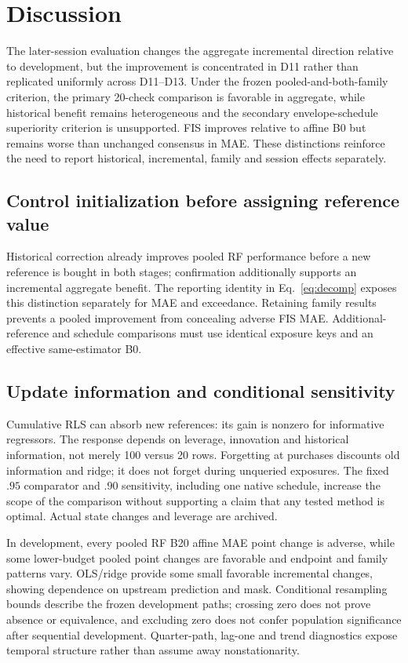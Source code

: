 \section{Discussion}\label{sec:discussion}
The later-session evaluation changes the aggregate incremental direction relative to development, but the improvement is concentrated in D11 rather than replicated uniformly across D11--D13. Under the frozen pooled-and-both-family criterion, the primary 20-check comparison is favorable in aggregate, while historical benefit remains heterogeneous and the secondary envelope-schedule superiority criterion is unsupported. FIS improves relative to affine B0 but remains worse than unchanged consensus in MAE. These distinctions reinforce the need to report historical, incremental, family and session effects separately.

\subsection{Control initialization before assigning reference value}
Historical correction already improves pooled RF performance before a new reference is bought in both stages; confirmation additionally supports an incremental aggregate benefit. The reporting identity in Eq.~\eqref{eq:decomp} exposes this distinction separately for MAE and exceedance. Retaining family results prevents a pooled improvement from concealing adverse FIS MAE. Additional-reference and schedule comparisons must use identical exposure keys and an effective same-estimator B0.

\subsection{Update information and conditional sensitivity}
Cumulative RLS can absorb new references: its gain is nonzero for informative regressors. The response depends on leverage, innovation and historical information, not merely 100 versus 20 rows. Forgetting at purchases discounts old information and ridge; it does not forget during unqueried exposures. The fixed $.95$ comparator and $.90$ sensitivity, including one native schedule, increase the scope of the comparison without supporting a claim that any tested method is optimal. Actual state changes and leverage are archived.

In development, every pooled RF B20 affine MAE point change is adverse, while some lower-budget pooled point changes are favorable and endpoint and family patterns vary. OLS/ridge provide some small favorable incremental changes, showing dependence on upstream prediction and mask. Conditional resampling bounds describe the frozen development paths; crossing zero does not prove absence or equivalence, and excluding zero does not confer population significance after sequential development. Quarter-path, lag-one and trend diagnostics expose temporal structure rather than assume away nonstationarity.

